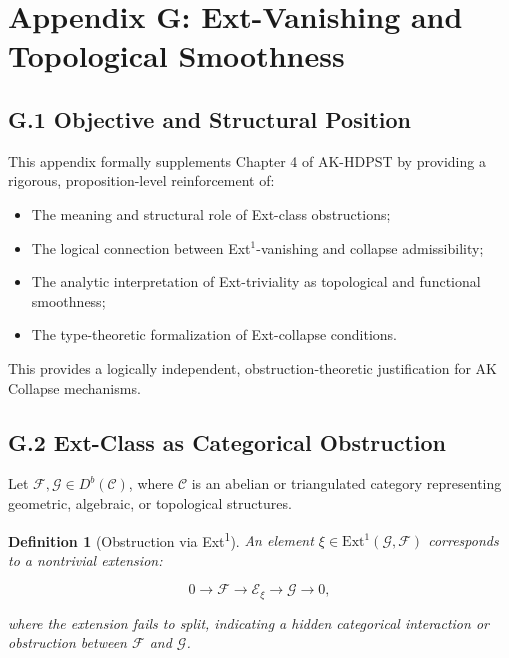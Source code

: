 \documentclass[11pt]{article}
\newtheorem{definition}[theorem]{Definition}
\begin{document}
\section*{Appendix G: Ext-Vanishing and Topological Smoothness}

\subsection*{G.1 Objective and Structural Position}

This appendix formally supplements Chapter 4 of AK-HDPST by providing a rigorous, proposition-level reinforcement of:

\begin{itemize}
    \item The meaning and structural role of Ext-class obstructions;
    \item The logical connection between Ext$^1$-vanishing and collapse admissibility;
    \item The analytic interpretation of Ext-triviality as topological and functional smoothness;
    \item The type-theoretic formalization of Ext-collapse conditions.
\end{itemize}

This provides a logically independent, obstruction-theoretic justification for AK Collapse mechanisms.

\subsection*{G.2 Ext-Class as Categorical Obstruction}

Let \( \mathcal{F}, \mathcal{G} \in D^b(\mathcal{C}) \), where \( \mathcal{C} \) is an abelian or triangulated category representing geometric, algebraic, or topological structures.

\begin{definition}[Obstruction via Ext\textsuperscript{1}]
An element \( \xi \in \mathrm{Ext}^1(\mathcal{G}, \mathcal{F}) \) corresponds to a nontrivial extension:

\[
0 \to \mathcal{F} \to \mathcal{E}_\xi \to \mathcal{G} \to 0,
\]

where the extension fails to split, indicating a hidden categorical interaction or obstruction between \( \mathcal{F} \) and \( \mathcal{G} \).
\end{definition}
\end{document}
